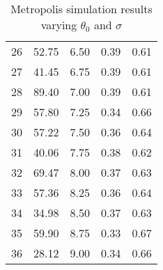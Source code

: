 \begin{center}
\begin{table}
\begin{tabular}{|ccccc|}
26 &    52.75 &     6.50 &     0.39 &     0.61 \\  
27 &    41.45 &     6.75 &     0.39 &     0.61 \\  
28 &    89.40 &     7.00 &     0.39 &     0.61 \\  
29 &    57.80 &     7.25 &     0.34 &     0.66 \\  
30 &    57.22 &     7.50 &     0.36 &     0.64 \\  
31 &    40.06 &     7.75 &     0.38 &     0.62 \\  
32 &    69.47 &     8.00 &     0.37 &     0.63 \\  
33 &    57.36 &     8.25 &     0.36 &     0.64 \\  
34 &    34.98 &     8.50 &     0.37 &     0.63 \\  
35 &    59.90 &     8.75 &     0.33 &     0.67 \\  
36 &    28.12 &     9.00 &     0.34 &     0.66 \\  
\end{tabular}
\caption{ Metropolis simulation results varying $\theta_0$ and $\sigma$ }
\end{table}
\end{center}
